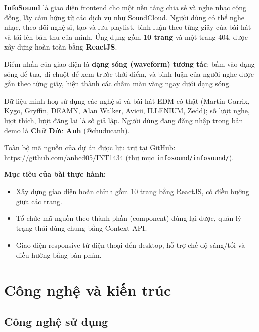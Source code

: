 \documentclass[12pt,a4paper]{article}
\begin{document}
\textbf{InfoSound} là giao diện frontend cho một nền tảng chia sẻ và nghe nhạc cộng đồng, lấy cảm hứng từ các dịch vụ như SoundCloud. Người dùng có thể nghe nhạc, theo dõi nghệ sĩ, tạo và lưu playlist, bình luận theo từng giây của bài hát và tải lên bản thu của mình. Ứng dụng gồm \textbf{10 trang} và một trang 404, được xây dựng hoàn toàn bằng \textbf{ReactJS}.

Điểm nhấn của giao diện là \textbf{dạng sóng (waveform) tương tác}: bấm vào dạng sóng để tua, di chuột để xem trước thời điểm, và bình luận của người nghe được gắn theo từng giây, hiện thành các chấm màu vàng ngay dưới dạng sóng.

Dữ liệu minh hoạ sử dụng các nghệ sĩ và bài hát EDM có thật (Martin Garrix, Kygo, Gryffin, DEAMN, Alan Walker, Avicii, ILLENIUM, Zedd); số lượt nghe, lượt thích, lượt đăng lại là số giả lập. Người dùng đang đăng nhập trong bản demo là \textbf{Chử Đức Anh} (@chuducanh).

Toàn bộ mã nguồn của dự án được lưu trữ tại GitHub: \url{https://github.com/anhcd05/INT1434} (thư mục \texttt{infosound/infosound/}).

\textbf{Mục tiêu của bài thực hành:}
\begin{itemize}
  \item Xây dựng giao diện hoàn chỉnh gồm 10 trang bằng ReactJS, có điều hướng giữa các trang.
  \item Tổ chức mã nguồn theo thành phần (component) dùng lại được, quản lý trạng thái dùng chung bằng Context API.
  \item Giao diện responsive từ điện thoại đến desktop, hỗ trợ chế độ sáng/tối và điều hướng bằng bàn phím.
\end{itemize}

\section{Công nghệ và kiến trúc}

\subsection{Công nghệ sử dụng}
\end{document}
